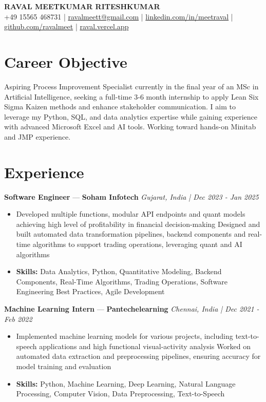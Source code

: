 \documentclass[a4paper,10pt]{article}
\begin{document}
\begin{center}
  {\Large\bfseries RAVAL MEETKUMAR RITESHKUMAR}\\[2pt]
  {\small +49 15565 468731 \;|\; \href{mailto:ravalmeett@gmail.com}{ravalmeett@gmail.com} \;|\; \href{https://www.linkedin.com/in/meetraval/}{linkedin.com/in/meetraval} \;|\; \href{https://github.com/ravalmeet}{github.com/ravalmeet} \;|\; \href{https://raval.vercel.app/}{raval.vercel.app}}
\end{center}
\vspace{-3pt}

\section*{Career Objective}
Aspiring Process Improvement Specialist currently in the final year of an MSc in Artificial Intelligence, seeking a full-time 3-6 month internship to apply Lean Six Sigma Kaizen methods and enhance stakeholder communication. I aim to leverage my Python, SQL, and data analytics expertise while gaining experience with advanced Microsoft Excel and AI tools. Working toward hands-on Minitab and JMP experience.\par

\section*{Experience}
\textbf{Software Engineer} — \textbf{Soham Infotech} \hfill \textit{Gujarat, India \;|\; Dec 2023 - Jan 2025}\par
\vspace{1pt}
\begin{itemize}
  \item Developed multiple functions, modular API endpoints and quant models achieving high level of profitability in financial decision-making Designed and built automated data transformation pipelines, backend components and real-time algorithms to support trading operations, leveraging quant and AI algorithms
  \item \textbf{Skills:} Data Analytics, Python, Quantitative Modeling, Backend Components, Real-Time Algorithms, Trading Operations, Software Engineering Best Practices, Agile Development
\end{itemize}
\vspace{3pt}
\textbf{Machine Learning Intern} — \textbf{Pantechelearning} \hfill \textit{Chennai, India \;|\; Dec 2021 - Feb 2022}\par
\vspace{1pt}
\begin{itemize}
  \item Implemented machine learning models for various projects, including text-to-speech applications and high functional visual-activity analysis Worked on automated data extraction and preprocessing pipelines, ensuring accuracy for model training and evaluation
  \item \textbf{Skills:} Python, Machine Learning, Deep Learning, Natural Language Processing, Computer Vision, Data Preprocessing, Text-to-Speech
\end{itemize}
\end{document}
